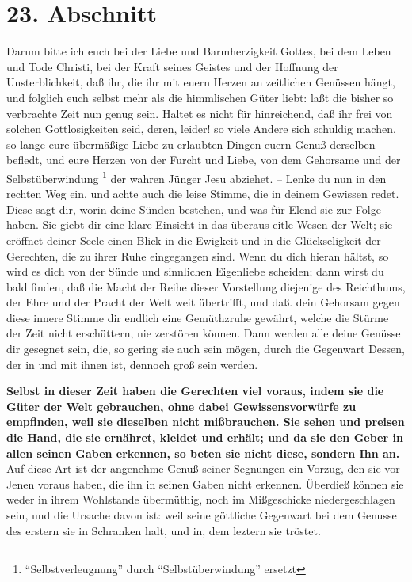 \section{23. Abschnitt} \label{kap4_ab23}

Darum bitte ich euch bei der Liebe und Barmherzigkeit Gottes, bei dem Leben und
Tode Christi, bei der Kraft seines Geistes und der Hoffnung der Unsterblichkeit,
daß ihr, die ihr mit euern Herzen an zeitlichen Genüssen hängt, und folglich
euch selbst mehr als die himmlischen Güter liebt: laßt die bisher so
verbrachte Zeit nun genug sein. Haltet es nicht für hinreichend, daß ihr frei
von solchen Gottlosigkeiten seid, deren, leider! so viele Andere sich schuldig
machen, so lange eure übermäßige Liebe zu erlaubten Dingen euern Genuß derselben
befledt, und eure Herzen von der Furcht und Liebe, von dem Gehorsame und der
Selbstüberwindung \footnote{"`Selbstverleugnung"' durch "`Selbstüberwindung"' ersetzt} der wahren Jünger Jesu abziehet. -- Lenke du nun in den
rechten Weg ein, und achte auch die leise Stimme, die in deinem Gewissen redet.
Diese sagt dir, worin deine Sünden bestehen, und was für Elend sie zur Folge
haben. Sie giebt dir eine klare Einsicht in das überaus eitle Wesen der Welt;
sie eröffnet deiner Seele einen Blick in die Ewigkeit und in die Glückseligkeit
der Gerechten, die zu ihrer Ruhe eingegangen sind. Wenn du dich hieran hältst,
so wird es dich von der Sünde und sinnlichen Eigenliebe scheiden; dann wirst du
bald finden, daß die Macht der Reihe dieser Vorstellung diejenige des
Reichthums, der Ehre und der Pracht der Welt weit übertrifft, und daß. dein
Gehorsam gegen diese innere Stimme dir endlich eine Gemüthzruhe gewährt, welche
die Stürme der Zeit nicht erschüttern, nie zerstören können. Dann werden alle
deine Genüsse dir gesegnet sein, die, so gering sie auch sein mögen, durch die
Gegenwart Dessen, der in und mit ihnen ist, dennoch groß sein werden.

\medskip

\textbf{Selbst in dieser Zeit haben die Gerechten viel voraus, indem sie die
Güter der
Welt gebrauchen, ohne dabei Gewissensvorwürfe zu empfinden, weil sie dieselben
nicht mißbrauchen. Sie sehen und preisen die Hand, die sie ernähret, kleidet und
erhält; und da sie den Geber in allen seinen Gaben erkennen, so beten sie nicht
diese, sondern Ihn an.} Auf diese Art ist der angenehme Genuß seiner Segnungen
ein Vorzug, den sie vor Jenen voraus haben, die ihn in seinen Gaben nicht
erkennen. Überdieß können sie weder in ihrem Wohlstande übermüthig, noch im
Mißgeschicke niedergeschlagen sein, und die Ursache davon ist: weil seine
göttliche Gegenwart bei dem Genusse des erstern sie in Schranken halt, und in,
dem leztern sie tröstet.

